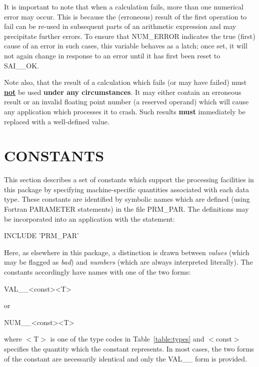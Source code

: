 \documentclass[11pt,nolof]{starlink}
\providecommand{\name}[1]{\mbox{#1}}
\begin{document}
It is important to note that when a calculation fails, more than
one numerical error may occur.
This is because the (erroneous) result of the first operation to fail can be
re-used in subsequent parts of an arithmetic expression and may precipitate
further errors.
To ensure that \name{NUM\_ERROR} indicates the true (first) cause of an error
in such cases, this variable behaves as a latch; once set, it will not again
change in response to an error until it has first been reset to
\name{SAI\_\_OK}.

Note also, that the result of a calculation which fails (or may have
failed) must \textbf{\underline{not}} be used \textbf{under any circumstances}.
It may either contain an erroneous result or an invalid floating point
number (a reserved operand) which will cause any application which processes
it to crash.
Such results \textbf{must} immediately be replaced with a well-defined value.

\section{CONSTANTS}

\label{section:constants}

This section describes a set of constants which support the processing
facilities in this package by specifying machine-specific quantities
associated with each data type.
These constants are identified by symbolic names which are defined (using
Fortran \name{PARAMETER} statements) in the file \name{PRM\_PAR}.
The definitions may be incorporated into an application with the statement:

\begin{terminalv}
INCLUDE 'PRM_PAR'
\end{terminalv}

Here, as elsewhere in this package, a distinction is drawn between \emph{values} (which may be flagged as \emph{bad}) and \emph{numbers} (which are
always interpreted literally).
The constants accordingly have names with one of the two forms:

\begin{terminalv}
VAL__<const><T>
\end{terminalv}
or
\begin{terminalv}
NUM__<const><T>
\end{terminalv}

where \name{$<$T$>$} is one of the type codes in Table~\ref{table:types} and
\name{$<$const$>$} specifies the quantity which the constant represents.
In most cases, the two forms of the constant are necessarily identical and
only the \name{VAL\_\_} form is provided.
\end{document}
